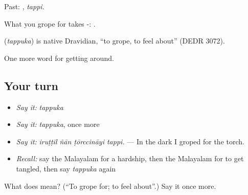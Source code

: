 Past: , \emph{tappi}.

What you grope for takes -:  .

\begin{cousinweb}
\textbf{} (\emph{tappuka}) is native Dravidian, \textquotedblleft{}to grope, to feel about\textquotedblright{} (DEDR 3072).
\end{cousinweb}

\begin{grammarlens}[title={What you've built}]
One more word for getting around.
\end{grammarlens}

\subsection*{Your turn}
\begin{itemize}
\raggedright
  \item \emph{Say it:} \emph{tappuka}
  \item \emph{Say it:} \emph{tappuka}, once more
  \item \emph{Say it:} \emph{iruṭṭil ñān ṭōrccināyi tappi.} — In the dark I groped for the torch.
  \item \emph{Recall:} say the Malayalam for a hardship, then the Malayalam for to get tangled, then say \emph{tappuka} again
\end{itemize}

\begin{tcolorbox}[breakable,colback=teal!4,colframe=teal!35!black,title={Before you move on}]
What does  mean? (\textquotedblleft{}To grope for; to feel about\textquotedblright{}.) Say it once more.
\end{tcolorbox}
